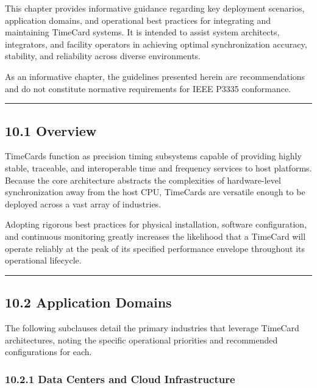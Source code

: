 \documentclass[
]{article}
\begin{document}
This chapter provides informative guidance regarding key deployment
scenarios, application domains, and operational best practices for
integrating and maintaining TimeCard systems. It is intended to assist
system architects, integrators, and facility operators in achieving
optimal synchronization accuracy, stability, and reliability across
diverse environments.

As an informative chapter, the guidelines presented herein are
recommendations and do not constitute normative requirements for IEEE
P3335 conformance.

\begin{center}\rule{0.5\linewidth}{0.5pt}\end{center}

\subsection{10.1 Overview}\label{overview-4}

TimeCards function as precision timing subsystems capable of providing
highly stable, traceable, and interoperable time and frequency services
to host platforms. Because the core architecture abstracts the
complexities of hardware-level synchronization away from the host CPU,
TimeCards are versatile enough to be deployed across a vast array of
industries.

Adopting rigorous best practices for physical installation, software
configuration, and continuous monitoring greatly increases the
likelihood that a TimeCard will operate reliably at the peak of its
specified performance envelope throughout its operational lifecycle.

\begin{center}\rule{0.5\linewidth}{0.5pt}\end{center}

\subsection{10.2 Application Domains}\label{application-domains}

The following subclauses detail the primary industries that leverage
TimeCard architectures, noting the specific operational priorities and
recommended configurations for each.

\subsubsection{10.2.1 Data Centers and Cloud
Infrastructure}\label{data-centers-and-cloud-infrastructure}
\end{document}
